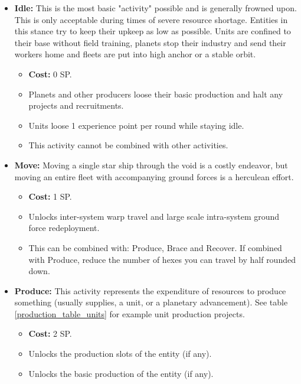 \begin{itemize}
	\item \textbf{Idle:} This is the most basic "activity" possible and is generally frowned upon. This is only acceptable during times of severe resource shortage. Entities in this stance try to keep their upkeep as low as possible. Units are confined to their base without field training, planets stop their industry and send their workers home and fleets are put into high anchor or a stable orbit.
	\begin{itemize}
		\item \textbf{Cost:} 0 SP.
		\item Planets and other producers loose their basic production and halt any projects and recruitments.
		\item Units loose 1 experience point per round while staying idle.
		\item This activity cannot be combined with other activities.
	\end{itemize}

	\item \textbf{Move:} Moving a single star ship through the void is a costly endeavor, but moving an entire fleet with accompanying ground forces is a herculean effort.
	\begin{itemize}
		\item \textbf{Cost:} 1 SP.
		\item Unlocks inter-system warp travel and large scale intra-system ground force redeployment.
		\item This can be combined with: Produce, Brace and Recover. If combined with Produce, reduce the number of hexes you can travel by half rounded down.
	\end{itemize}

	
	\item \textbf{Produce:} This activity represents the expenditure of resources to produce something (usually supplies, a unit, or a planetary advancement). See table \ref{production_table_units} for example unit production projects.
	\begin{itemize}
		\item \textbf{Cost:} 2 SP.
		\item Unlocks the production slots of the entity (if any).
		\item Unlocks the basic production of the entity (if any).
	\end{itemize}
	

\end{itemize}
